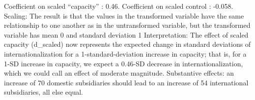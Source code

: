 \documentclass[11pt,]{book}
\newenvironment{Shaded}{\begin{snugshade}}{\end{snugshade}}
\newcommand{\DataTypeTok}[1]{\textcolor[rgb]{0.13,0.29,0.53}{#1}}
\newcommand{\DecValTok}[1]{\textcolor[rgb]{0.00,0.00,0.81}{#1}}
\newcommand{\KeywordTok}[1]{\textcolor[rgb]{0.13,0.29,0.53}{\textbf{#1}}}
\newcommand{\NormalTok}[1]{#1}
\newcommand{\OperatorTok}[1]{\textcolor[rgb]{0.81,0.36,0.00}{\textbf{#1}}}
\newcommand{\StringTok}[1]{\textcolor[rgb]{0.31,0.60,0.02}{#1}}
\begin{document}
Coefficient on scaled ``capacity'' : 0.46. Coefficient on scaled control : -0.058. Scaling: The result is that the values in the transformed variable have the same relationship to one another as in the untransformed variable, but the transformed variable has mean 0 and standard deviation 1 Interpretation: The effect of scaled capacity (d\_scaled) now represents the expected change in standard deviations of internationalization for a 1-standard-deviation increase in capacity; that is, for a 1-SD increase in capacity, we expect a 0.46-SD decrease in internationalization, which we could call an effect of moderate magnitude. Substantive effects: an increase of 70 domestic subsidiaries should lead to an increase of 54 international subsidiaries, all else equal.

\begin{Shaded}
\end{Shaded}
\end{document}
